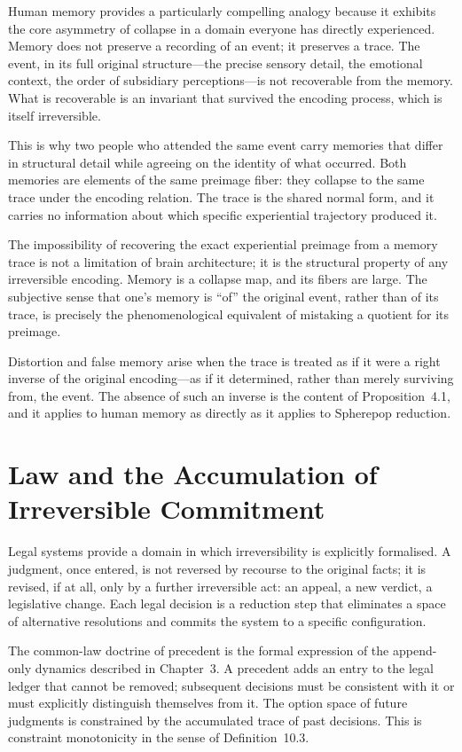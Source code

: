 \documentclass[12pt, oneside]{amsbook}
\theoremstyle{plain}
\theoremstyle{definition}
\theoremstyle{remark}
\begin{document}
Human memory provides a particularly compelling analogy because it exhibits the
core asymmetry of collapse in a domain everyone has directly experienced.
Memory does not preserve a recording of an event; it preserves a trace. The
event, in its full original structure---the precise sensory detail, the
emotional context, the order of subsidiary perceptions---is not recoverable
from the memory. What is recoverable is an invariant that survived the
encoding process, which is itself irreversible.

This is why two people who attended the same event carry memories that differ
in structural detail while agreeing on the identity of what occurred. Both
memories are elements of the same preimage fiber: they collapse to the same
trace under the encoding relation. The trace is the shared normal form, and
it carries no information about which specific experiential trajectory produced
it.

The impossibility of recovering the exact experiential preimage from a memory
trace is not a limitation of brain architecture; it is the structural property
of any irreversible encoding. Memory is a collapse map, and its fibers are
large. The subjective sense that one's memory is ``of'' the original event,
rather than of its trace, is precisely the phenomenological equivalent of
mistaking a quotient for its preimage.

Distortion and false memory arise when the trace is treated as if it were a
right inverse of the original encoding---as if it determined, rather than
merely surviving from, the event. The absence of such an inverse is the
content of Proposition~4.1, and it applies to human memory as directly as it
applies to Spherepop reduction.

\section{Law and the Accumulation of Irreversible Commitment}

Legal systems provide a domain in which irreversibility is explicitly
formalised. A judgment, once entered, is not reversed by recourse to the
original facts; it is revised, if at all, only by a further irreversible act:
an appeal, a new verdict, a legislative change. Each legal decision is a
reduction step that eliminates a space of alternative resolutions and commits
the system to a specific configuration.

The common-law doctrine of precedent is the formal expression of the
append-only dynamics described in Chapter~3. A precedent adds an entry to
the legal ledger that cannot be removed; subsequent decisions must be
consistent with it or must explicitly distinguish themselves from it. The
option space of future judgments is constrained by the accumulated trace of
past decisions. This is constraint monotonicity in the sense of
Definition~10.3.
\end{document}
